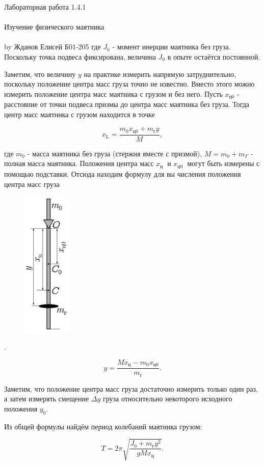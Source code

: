 \documentclass{astroedu-lab}
\begin{document}
\begin{problem}{\huge Лабораторная работа 1.4.1\\\\Изучение физического маятника\\\\by Жданов Елисей Б01-205}
где \(J_{0}\) - момент инерции маятника без груза. Поскольку точка подвеса фиксирована, величина \(J_{0}\) в опыте остаётся постоянной.

Заметим, что величину \(y\) на практике измерить напрямую затруднительно, поскольку положение центра масс груза точно не известно. Вместо этого можно измерить положение центра масс маятника с грузом и без него. Пусть \(x_{\text {ц0}}\) - расстояние от точки подвеса призмы до центра масс маятника без груза. Тогда центр масс маятника с грузом находится в точке

\[
x_{\mathrm{L}}=\frac{{m_{0} x_{\text{ц0}}}+m_{\text{г}} y}{M},
\]

где \(m_{0}\) - масса маятника без груза (стержня вместе с призмой), \(M=m_{0}+m_{\Gamma}\) - полная масса маятника. Положения центра масс \(x_{\text {ц }}\) и \(x_{\text {ц0 }}\) могут быть измерены с помощью подставки. Отсюда находим формулу для вы 	числения положения центра масс груза

\begin{figure}
\includegraphics[width=0.2\textwidth]{theory_1.png}
\caption{}
\label{ris:image}
\end{figure}.

\[
y=\frac{M x_{\text{ц}}-m_{0} x_{\text{ц} 0}}{m_{\text{г}}} .
\]

Заметим, что положение центра масс груза достаточно измерить только один раз, а затем измерять смещение \(\Delta y\) груза относительно некоторого исходного положения \(y_{0}\).

Из общей формулы найдём период колебаний маятника грузом:

\[
T=2 \pi \sqrt{\frac{J_{0}+m_{\text{г}} y^{2}}{g M x_{\text{ц}}}} .
\]


\end{problem}
\end{document}
